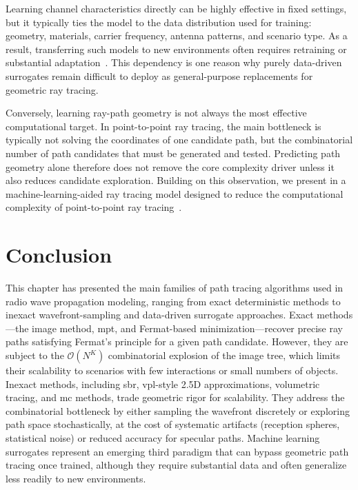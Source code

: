 Learning channel characteristics directly can be highly effective in fixed settings, but it typically ties the model to the data distribution used for training: geometry, materials, carrier frequency, antenna patterns, and scenario type. As a result, transferring such models to new environments often requires retraining or substantial adaptation~. This dependency is one reason why purely data-driven surrogates remain difficult to deploy as general-purpose replacements for geometric ray tracing.

Conversely, learning ray-path geometry is not always the most effective computational target. In point-to-point ray tracing, the main bottleneck is typically not solving the coordinates of one candidate path, but the combinatorial number of path candidates that must be generated and tested. Predicting path geometry alone therefore does not remove the core complexity driver unless it also reduces candidate exploration. Building on this observation, we present in  a machine-learning-aided ray tracing model designed to reduce the computational complexity of point-to-point ray tracing~.

\section{Conclusion}

This chapter has presented the main families of path tracing algorithms used in radio wave propagation modeling, ranging from exact deterministic methods to inexact wavefront-sampling and data-driven surrogate approaches. Exact methods---the image method, \gls{mpt}, and Fermat-based minimization---recover precise ray paths satisfying Fermat's principle for a given path candidate. However, they are subject to the $\mathcal{O}(N^K)$ combinatorial explosion of the image tree, which limits their scalability to scenarios with few interactions or small numbers of objects. Inexact methods, including \gls{sbr}, \gls{vpl}-style 2.5D approximations, volumetric tracing, and \gls{mc} methods, trade geometric rigor for scalability. They address the combinatorial bottleneck by either sampling the wavefront discretely or exploring path space stochastically, at the cost of systematic artifacts (reception spheres, statistical noise) or reduced accuracy for specular paths. Machine learning surrogates represent an emerging third paradigm that can bypass geometric path tracing once trained, although they require substantial data and often generalize less readily to new environments.

